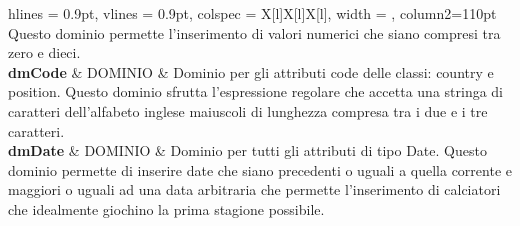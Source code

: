 \begin{tblr}{
    hlines = {0.9pt}, vlines = {0.9pt}, colspec = {X[l]X[l]X[l]}, 
    width = \textwidth , column{2}={110pt}
}
{		Questo dominio permette l'inserimento di
		valori numerici che siano compresi tra zero e dieci.
	}
	\\
	{
		\textbf{dmCode}
	}
	&
	{
		DOMINIO
	}
	&
	{
		Dominio per gli attributi code delle classi:
		country e position.
		Questo dominio sfrutta l'espressione regolare
		che accetta una stringa di caratteri 
		dell'alfabeto inglese maiuscoli di 
		lunghezza compresa tra
		i due e i tre caratteri.
	}
	\\
	{
		\textbf{dmDate}
	}
	&
	{
		DOMINIO
	}
	&
	{
		Dominio per tutti gli attributi di tipo Date.
		Questo dominio permette di inserire date che siano
		precedenti o uguali a quella corrente
		e maggiori o uguali ad una data arbitraria
		che permette l'inserimento di calciatori
		che idealmente giochino la prima stagione
		possibile.
	}
	\\
\end{tblr}


\newpage

